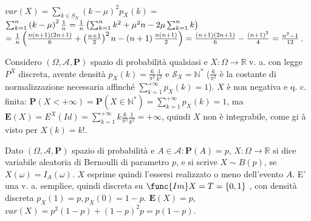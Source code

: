 \documentclass{article}
\begin{document}
\begin{description}
\item $var\left( X\right) =\sum_{k\in S_{X}}\left( k-\mu \right)
^{2}p_{X}\left( k\right) =$ $\sum_{k=1}^{n}\left( k-\mu \right) ^{2}\frac{1}{%
n}=\frac{1}{n}\left( \sum_{k=1}^{n}k^{2}+\mu ^{2}n-2\mu
\sum_{k=1}^{n}k\right) $ $=\frac{1}{n}\left( \frac{n\left( n+1\right) \left(
2n+1\right) }{6}+\left( \frac{n+1}{2}\right) ^{2}n-\left( n+1\right) \frac{%
n\left( n+1\right) }{2}\right) =\frac{\left( n+1\right) \left( 2n+1\right) }{%
6}-\frac{\left( n+1\right) ^{2}}{4}=\frac{n^{2}-1}{12}$.

\item[E3] Considero $\left( \Omega ,\mathcal{A},\mathbf{P}\right) $ spazio
di probabilit\`{a} qualsiasi e $X:\Omega \rightarrow 
\mathbb{R}
$ v. a. con legge $P^{X}$ discreta, avente densit\`{a} $p_{X}\left( k\right)
=\frac{6}{\pi ^{2}}\frac{1}{k^{2}}$ e $\mathcal{S}_{X}=%
\mathbb{N}
^{\ast }$ ($\frac{6}{\pi ^{2}}$ \`{e} la costante di normalizzazione
necessaria affinch\'{e} $\sum_{k=1}^{+\infty }p_{X}\left( k\right) =1$). $X$ 
\`{e} non negativa e q. c. finita: $\mathbf{P}\left( X<+\infty \right) =%
\mathbf{P}\left( X\in 
\mathbb{N}
^{\ast }\right) =\sum_{k=1}^{+\infty }p_{X}\left( k\right) =1$, ma $\mathbf{E%
}\left( X\right) =E^{X}\left( Id\right) =\sum_{k=1}^{+\infty }k\frac{6}{\pi
^{2}}\frac{1}{k^{2}}=+\infty $, quindi $X$ non \`{e} integrabile, come gi%
\`{a} visto per $X\left( k\right) =k!$.

\item[E4] Dato $\left( \Omega ,\mathcal{A},\mathbf{P}\right) $ spazio di
probabilit\`{a} e $A\in \mathcal{A}:\mathbf{P}\left( A\right) =p$, $X:\Omega
\rightarrow 
\mathbb{R}
$ si dice variabile aleatoria di Bernoulli di parametro $p$, e si scrive $%
X\sim B\left( p\right) $, se $X\left( \omega \right) =I_{A}\left( \omega
\right) $. $X$ esprime quindi l'essersi realizzato o meno dell'evento $A$.
E' una v. a. semplice, quindi discreta su $\func{Im}X=T=\left\{ 0,1\right\} $%
, con densit\`{a} discreta $p_{X}\left( 1\right) =p,p_{X}\left( 0\right)
=1-p $. $\mathbf{E}\left( X\right) =p$, $var\left( X\right) =p^{2}\left(
1-p\right) +\left( 1-p\right) ^{2}p=p\left( 1-p\right) $.


\end{description}
\end{document}
